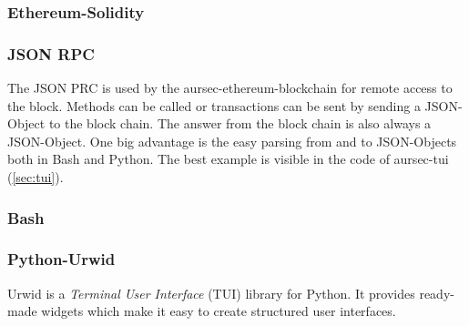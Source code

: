 
\subsubsection*{Ethereum-Solidity}
\subsubsection*{JSON RPC}
The JSON PRC is used by the aursec-ethereum-blockchain for remote access to the block. Methods can be called or transactions can be sent by sending a JSON-Object to the block chain. The answer from the block chain is also always a JSON-Object. One big advantage is the easy parsing from and to JSON-Objects both in Bash and Python. The best example is visible in the code of aursec-tui (\ref{sec:tui}).
\subsubsection*{Bash}
\subsubsection*{Python-Urwid}
Urwid is a \emph{Terminal User Interface} (TUI) library for Python. It provides ready-made widgets which make it easy to create structured user interfaces.